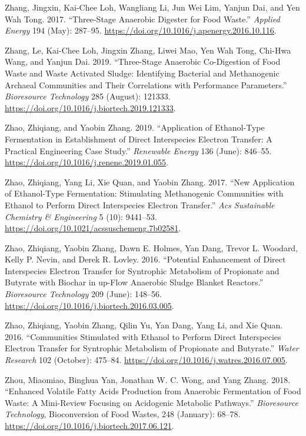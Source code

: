 \documentclass[11pt]{report}
\begin{document}
\begin{hangparas}{1.5em}{1}
\hypertarget{citeproc_bib_item_100}{Zhang, Jingxin, Kai-Chee Loh, Wangliang Li, Jun Wei Lim, Yanjun Dai, and Yen Wah Tong. 2017. “Three-Stage Anaerobic Digester for Food Waste.” \textit{Applied Energy} 194 (May): 287–95. \url{https://doi.org/10.1016/j.apenergy.2016.10.116}.}

\hypertarget{citeproc_bib_item_101}{Zhang, Le, Kai-Chee Loh, Jingxin Zhang, Liwei Mao, Yen Wah Tong, Chi-Hwa Wang, and Yanjun Dai. 2019. “Three-Stage Anaerobic Co-Digestion of Food Waste and Waste Activated Sludge: Identifying Bacterial and Methanogenic Archaeal Communities and Their Correlations with Performance Parameters.” \textit{Bioresource Technology} 285 (August): 121333. \url{https://doi.org/10.1016/j.biortech.2019.121333}.}

\hypertarget{citeproc_bib_item_102}{Zhao, Zhiqiang, and Yaobin Zhang. 2019. “Application of Ethanol-Type Fermentation in Establishment of Direct Interspecies Electron Transfer: A Practical Engineering Case Study.” \textit{Renewable Energy} 136 (June): 846–55. \url{https://doi.org/10.1016/j.renene.2019.01.055}.}

\hypertarget{citeproc_bib_item_103}{Zhao, Zhiqiang, Yang Li, Xie Quan, and Yaobin Zhang. 2017. “New Application of Ethanol-Type Fermentation: Stimulating Methanogenic Communities with Ethanol to Perform Direct Interspecies Electron Transfer.” \textit{Acs Sustainable Chemistry \& Engineering} 5 (10): 9441–53. \url{https://doi.org/10.1021/acssuschemeng.7b02581}.}

\hypertarget{citeproc_bib_item_104}{Zhao, Zhiqiang, Yaobin Zhang, Dawn E. Holmes, Yan Dang, Trevor L. Woodard, Kelly P. Nevin, and Derek R. Lovley. 2016. “Potential Enhancement of Direct Interspecies Electron Transfer for Syntrophic Metabolism of Propionate and Butyrate with Biochar in up-Flow Anaerobic Sludge Blanket Reactors.” \textit{Bioresource Technology} 209 (June): 148–56. \url{https://doi.org/10.1016/j.biortech.2016.03.005}.}

\hypertarget{citeproc_bib_item_105}{Zhao, Zhiqiang, Yaobin Zhang, Qilin Yu, Yan Dang, Yang Li, and Xie Quan. 2016. “Communities Stimulated with Ethanol to Perform Direct Interspecies Electron Transfer for Syntrophic Metabolism of Propionate and Butyrate.” \textit{Water Research} 102 (October): 475–84. \url{https://doi.org/10.1016/j.watres.2016.07.005}.}

\hypertarget{citeproc_bib_item_106}{Zhou, Miaomiao, Binghua Yan, Jonathan W. C. Wong, and Yang Zhang. 2018. “Enhanced Volatile Fatty Acids Production from Anaerobic Fermentation of Food Waste: A Mini-Review Focusing on Acidogenic Metabolic Pathways.” \textit{Bioresource Technology}, Bioconversion of Food Wastes, 248 (January): 68–78. \url{https://doi.org/10.1016/j.biortech.2017.06.121}.}


\end{hangparas}
\end{document}
